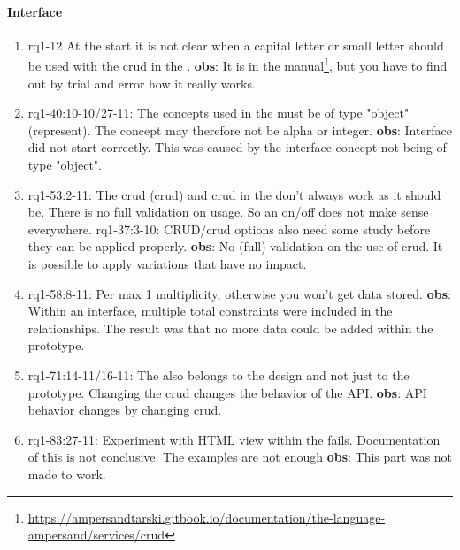 \paragraph{Interface}
\begin{enumerate}
    \item rq1-12 At the start it is not clear when a capital letter or small letter should be used with the crud in the .
    \newline\textbf{obs}: It is in the manual\footnote{\url{https://ampersandtarski.gitbook.io/documentation/the-language-ampersand/services/crud}}, 
    but you have to find out by trial and error how it really works.
    
    \item rq1-40:10-10/27-11: The concepts used in the  must be of type "object" (represent).
    The concept may therefore not be alpha or integer.
    \newline\textbf{obs}: Interface did not start correctly.
    This was caused by the interface concept not being of type "object".

    \item rq1-53:2-11: The {crud} (\acrlong{crud}) and \acrshort{crud} in the  don't always work as it should be.
    There is no full validation on usage.
    So an on/off does not make sense everywhere.
    \newline rq1-37:3-10: CRUD/crud options also need some study before they can be applied properly.
    \newline\textbf{obs}: No (full) validation on the use of crud.
    It is possible to apply variations that have no impact.

    \item rq1-58:8-11: Per  max 1 {multiplicity}, otherwise you won't get data stored.
    \newline\textbf{obs}: Within an interface, multiple total constraints were included in the relationships.
    The result was that no more data could be added within the prototype.

    \item rq1-71:14-11/16-11: The  also belongs to the design and not just to the prototype.
    Changing the \acrlong{crud} changes the behavior of the API.
    \newline\textbf{obs}: API behavior changes by changing \acrshort{crud}.

    \item rq1-83:27-11: Experiment with HTML view within the  fails.
    Documentation of this is not conclusive.
    The examples are not enough
    \newline\textbf{obs}: This part was not made to work.    


\end{enumerate}
